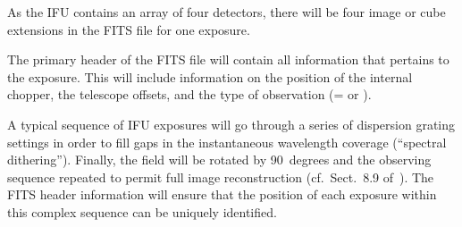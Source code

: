 As the IFU contains an array of four detectors, there will be four
image or cube extensions in the FITS file for one exposure.

The primary header of the FITS file will contain all information that
pertains to the exposure. This will include information on the
position of the internal chopper, the telescope offsets, and the type
of observation (= or ).

A typical sequence of IFU exposures will go through a series of
dispersion grating settings in order to fill gaps in the instantaneous
wavelength coverage (``spectral dithering''). Finally, the field will be
rotated by 90~degrees and the observing sequence repeated to permit
full image reconstruction
(cf.~Sect.~8.9 of~\cite{DRLS}). The FITS header
information will ensure that the position of each exposure within this
complex sequence can be uniquely identified.




